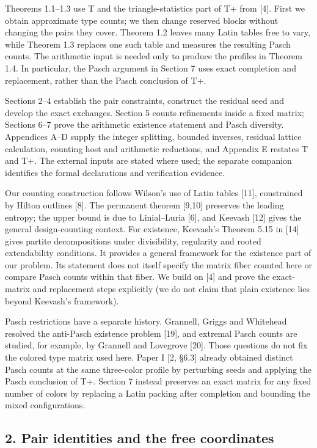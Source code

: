 \documentclass[english,11pt,a4paper]{article}
\begin{document}
Theorems 1.1--1.3 use T and the triangle-statistics part of T+ from {[}4{]}. First we obtain approximate type counts; we then change reserved blocks without changing the pairs they cover. Theorem 1.2 leaves many Latin tables free to vary, while Theorem 1.3 replaces one such table and measures the resulting Pasch counts. The arithmetic input is needed only to produce the profiles in Theorem 1.4. In particular, the Pasch argument in Section 7 uses exact completion and replacement, rather than the Pasch conclusion of T+.

Sections 2--4 establish the pair constraints, construct the residual seed and develop the exact exchanges. Section 5 counts refinements inside a fixed matrix; Sections 6--7 prove the arithmetic existence statement and Pasch diversity. Appendices A--D supply the integer splitting, bounded inverses, residual lattice calculation, counting host and arithmetic reductions, and Appendix E restates T and T+. The external inputs are stated where used; the separate companion identifies the formal declarations and verification evidence.

Our counting construction follows Wilson's use of Latin tables {[}11{]}, constrained by Hilton outlines {[}8{]}. The permanent theorem {[}9,10{]} preserves the leading entropy; the upper bound is due to Linial--Luria {[}6{]}, and Keevash {[}12{]} gives the general design-counting context. For existence, Keevash's Theorem 5.15 in {[}14{]} gives partite decompositions under divisibility, regularity and rooted extendability conditions. It provides a general framework for the existence part of our problem. Its statement does not itself specify the matrix fiber counted here or compare Pasch counts within that fiber. We build on {[}4{]} and prove the exact-matrix and replacement steps explicitly (we do not claim that plain existence lies beyond Keevash's framework).

Pasch restrictions have a separate history. Grannell, Griggs and Whitehead resolved the anti-Pasch existence problem {[}19{]}, and extremal Pasch counts are studied, for example, by Grannell and Lovegrove {[}20{]}. Those questions do not fix the colored type matrix used here. Paper I {[}2, §6.3{]} already obtained distinct Pasch counts at the same three-color profile by perturbing seeds and applying the Pasch conclusion of T+. Section 7 instead preserves an exact matrix for any fixed number of colors by replacing a Latin packing after completion and bounding the mixed configurations.

\subsection{2. Pair identities and the free coordinates}\label{pair-identities-and-the-free-coordinates}
\end{document}
